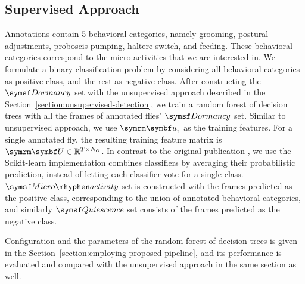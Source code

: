 \subsection{Supervised Approach}\label{section:supervised-detection}
Annotations contain 5 behavioral categories, namely grooming, postural adjustments, proboscis pumping, haltere switch, and feeding.
These behavioral categories correspond to the micro-activities that we are interested in.
We formulate a binary classification problem by considering all behavioral categories as positive class, and the rest as negative class.
After constructing the $\Dormancy$ set with the unsupervised approach described in the Section~\ref{section:unsupervised-detection}, we train a random forest of decision trees \citep{breiman_random_2001} with all the frames of annotated flies' $\Dormancy$ set.
Similar to unsupervised approach, we use $\V{u}_i$ as the training features. For a single annotated fly, the resulting training feature matrix is $\V{U} \in \reals^{T \times N_G}$.
In contrast to the original publication \citep{breiman_random_2001}, we use the Scikit-learn \citep{pedregosa_scikit-learn_2011} implementation combines classifiers by averaging their probabilistic prediction, instead of letting each classifier vote for a single class.
$\MicroActivity$ set is constructed with the frames predicted as the positive class, corresponding to the union of annotated behavioral categories, and similarly $\Quiescence$ set consists of the frames predicted as the negative class.

Configuration and the parameters of the random forest of decision trees is given in the Section~\ref{section:employing-proposed-pipeline}, and its performance is evaluated and compared with the unsupervised approach in the same section as well.
